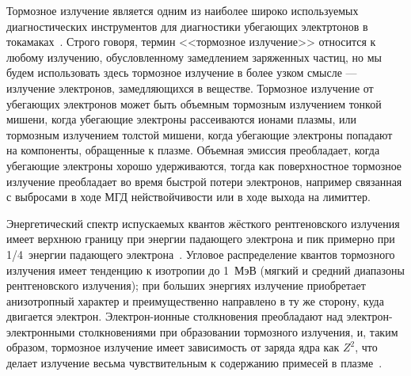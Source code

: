 Тормозное излучение является одним из наиболее широко используемых диагностических инструментов для диагностики убегающих электртонов в токамаках~\cite{Breizman2019,Cooper2016,Shevelev2013,Chugunov2011}. Строго говоря, термин  <<тормозное излучение>> относится к любому излучению, обусловленному замедлением заряженных частиц, но мы будем использовать здесь тормозное излучение в более узком смысле — излучение электронов, замедляющихся в веществе. Тормозное излучение от убегающих электронов может быть объемным тормозным излучением тонкой мишени, когда убегающие электроны рассеиваются ионами плазмы, или тормозным излучением толстой мишени, когда убегающие электроны попадают на компоненты, обращенные к плазме. Объемная эмиссия преобладает, когда убегающие электроны хорошо удерживаются, тогда как поверхностное тормозное излучение преобладает во время быстрой потери электронов, например связанная с выбросами в ходе МГД нействойчивости или в ходе выхода на лимиттер.~\cite{Breizman2019}

Энергетический спектр испускаемых квантов жёсткого рентгеновского излучения имеет верхнюю границу при энергии падающего электрона и пик примерно при 1/4~энергии падающего электрона~\cite{Seltzer1985,Kuznetsov1974,Shevelev2013}. Угловое распределение квантов тормозного излучения имеет тенденцию к изотропии до 1~МэВ (мягкий и средний диапазоны рентгеновского излучения); при больших энергиях излучение приобретает анизотропный характер и преимущественно направлено в ту же сторону, куда двигается электрон. Электрон-ионные столкновения преобладают над электрон-электронными столкновениями при образовании тормозного излучения, и, таким образом, тормозное излучение имеет зависимость от заряда ядра как $Z^2$, что делает излучение весьма чувствительным к содержанию примесей в плазме~\cite{Seltzer1985,Breizman2019}.

